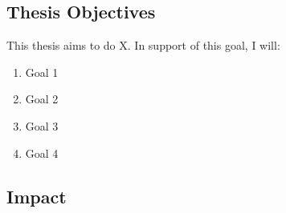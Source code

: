 
\subsection{Thesis Objectives}

This thesis aims to do X. In support of this goal, I will:

\begin{enumerate}
    \item Goal 1
    \item Goal 2
    \item Goal 3
    \item Goal 4
\end{enumerate}

\subsection{Impact}


